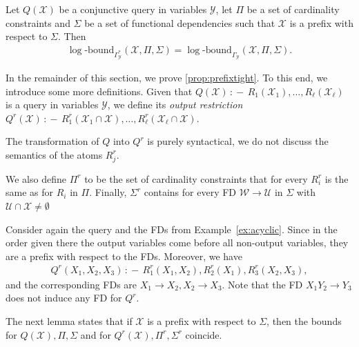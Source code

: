 \documentclass[a4paper,cleveref]{lipics-v2021}
\newcommand{\logb}{\mathrm{\log\text{-}bound}}
\newcommand{\vset}[1]{\mathcal{#1}}
\newcommand{\datarule}{{\,:\!\!-\,}}
\begin{document}
\begin{theorem}\label{prop:prefixtight}
 Let $Q(\vset X)$ be a conjunctive query in variables $\vset Y$, let $\Pi$ be a set of cardinality constraints and $\Sigma$ be a set of functional dependencies such that $\vset X$ is a prefix with respect to $\Sigma$. Then
\begin{align*}
	\logb_{\Gamma^*_{\vset Y}}(\vset X, \Pi, \Sigma) = \logb_{\Gamma_{\vset Y}}(\vset X, \Pi, \Sigma).
\end{align*} 
\end{theorem}

In the remainder of this section, we prove \cref{prop:prefixtight}. To this end, we introduce some more definitions.
Given that  
\(
Q(\vset X) \datarule  R_1(\vset X_1), \ldots,R_\ell (\vset X_\ell)  
\)
is  a query in variables $\vset Y$, we define its \emph{output restriction} 
\(
Q^r(\vset X)  \datarule   R^r_1(\vset X_1\cap \vset X), \ldots, R^r_\ell(\vset X_\ell\cap \vset X).
\)
\begin{remark}
The transformation of $Q$ into $Q^r$ is purely syntactical, we do not discuss the semantics of the atoms $R^r_j$.  
\end{remark}

We also define $\Pi^r$ to be the set of cardinality constraints that for every $R_i^r$ is the same as for $R_i$ in $\Pi$. Finally, $\Sigma^r$ contains for every FD $\vset W \rightarrow \vset U$ in $\Sigma$ with $\vset U\cap \vset X\ne \emptyset$
\begin{example}
	Consider again the query and the FDs from Example~\ref{ex:acyclic}.
	Since in the order given there the output variables come before all non-output variables, they are a prefix with respect to the FDs. Moreover, we have 
	\begin{align*}
	Q^r(X_1,X_2, X_3) \datarule R_1^r(X_1, X_2),R_2^r(X_1),R_3^r(X_2, X_3),
\end{align*}
and the corresponding FDs are $X_1\rightarrow X_2, X_2\rightarrow X_3$. Note that the FD $X_1Y_2\rightarrow Y_3$ does not induce any FD for $Q^r$.
\end{example}

The next lemma states that if $\vset X$ is a prefix with respect to $\Sigma$, then the bounds for $Q(\vset X), \Pi, \Sigma$ and for $Q^r(\vset X), \Pi^r, \Sigma^r$ coincide.
\end{document}
